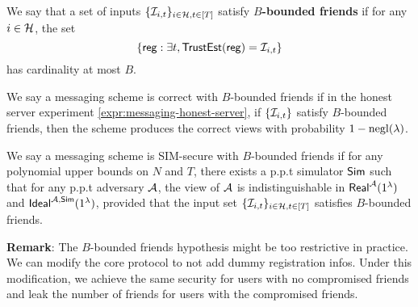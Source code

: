 
\begin{definition}
\label{defn:messaging-security-weaker}
We say that a set of inputs $\{\mathcal{I}_{i, t}\}_{i \in \mathcal{H}, t \in [T]}$ satisfy \textbf{$B$-bounded friends} if for any $i \in \mathcal{H}$, the set
$$\{\mathsf{reg}: \exists t, \mathsf{TrustEst}(\mathsf{reg}) = \mathcal{I}_{i, t}\}$$
has cardinality at most $B$.

We say a messaging scheme is correct with $B$-bounded friends if in the honest server experiment \cref{expr:messaging-honest-server}, if $\{\mathcal{I}_{i, t}\}$ satisfy $B$-bounded friends, then the scheme produces the correct views with probability $1 - \operatorname{negl}(\lambda)$.

We say a messaging scheme is SIM-secure with $B$-bounded friends if for any polynomial upper bounds on $N$ and $T$, there exists a p.p.t simulator $\mathsf{Sim}$ such that for any p.p.t adversary $\mathcal{A}$, the view of $\mathcal{A}$ is indistinguishable in $\mathsf{Real}^{\mathcal{A}}(1^{\lambda})$ and $\mathsf{Ideal}^{\mathcal{A}, \mathsf{\mathsf{Sim}}}(1^{\lambda})$, provided that the input set $\{\mathcal{I}_{i, t}\}_{i \in \mathcal{H}, t \in [T]}$ satisfies $B$-bounded friends.
\end{definition}

\textbf{Remark}: The $B$-bounded friends hypothesis might be too restrictive in practice. We can modify the core protocol to not add dummy registration infos. Under this modification, we achieve the same security for users with no compromised friends and leak the number of friends for users with the compromised friends.